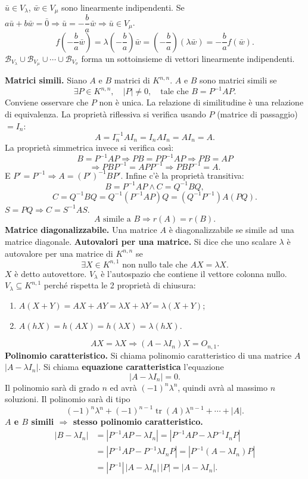 \documentclass[11pt,a4paper]{article}
\newcommand{\pagina}[1]{\clearpage}
\begin{document}
$\bar u\in V_\lambda$, $\bar w\in V_\mu$ sono linearmente indipendenti.
Se $a\bar u+b\bar w=\bar0\Longrightarrow\bar u=-\dfrac ba\bar w\Longrightarrow\bar u\in V_\mu$.
\[f\left(-\frac ba\bar w\right)=\lambda\left(-\frac ba\right)\bar w=\left(-\frac ba\right)(\lambda\bar w)=-\frac ba f(\bar w).\]
$\mathcal B_{V_\lambda}\cup\mathcal B_{V_\mu}\cup\cdots\cup\mathcal B_{V_\sigma}$ forma un sottoinsieme di vettori linearmente indipendenti.

\pagina{52}
\textbf{Matrici simili.} Siano $A$ e $B$ matrici di $K^{n,n}$. $A$ e $B$ sono matrici simili se
\[\exists P\in K^{n,n},\quad |P|\ne0,\quad\text{tale che }B=P^{-1}AP.\]
Conviene osservare che $P$ non è unica.
La relazione di similitudine è una relazione di equivalenza.
La proprietà riflessiva si verifica usando $P$ (matrice di passaggio) $=I_n$:
\[A=I_n^{-1}AI_n=I_nAI_n=AI_n=A.\]
La proprietà simmetrica invece si verifica così:
\[B=P^{-1}AP\Longrightarrow PB=PP^{-1}AP\Longrightarrow PB=AP\]
\[\Longrightarrow PBP^{-1}=APP^{-1}\Longrightarrow PBP^{-1}=A.\]
E $P'=P^{-1}\Longrightarrow A=(P')^{-1}BP'$.
Infine c'è la proprietà transitiva:
\[B=P^{-1}AP\land C=Q^{-1}BQ,\]
\[C=Q^{-1}BQ=Q^{-1}(P^{-1}AP)Q=(Q^{-1}P^{-1})A(PQ).\]
$S=PQ\Longrightarrow C=S^{-1}AS$.
\[A\text{ simile a }B\Longrightarrow r(A)=r(B).\]
\textbf{Matrice diagonalizzabile.} Una matrice $A$ è diagonalizzabile se simile ad una matrice diagonale.
\pagina{53}
\textbf{Autovalori per una matrice.} Si dice che uno scalare $\lambda$ è autovalore per una matrice di $K^{n,n}$ se
\[\exists X\in K^{n,1}\text{ non nullo tale che }AX=\lambda X.\]
$X$ è detto autovettore. $V_\lambda$ è l'autospazio che contiene il vettore colonna nullo. $V_\lambda\subseteq K^{n,1}$ perché rispetta le 2 proprietà di chiusura:
\begin{enumerate}\item $A(X+Y)=AX+AY=\lambda X+\lambda Y=\lambda(X+Y)$;
\item $A(hX)=h(AX)=h(\lambda X)=\lambda(hX)$.\end{enumerate}
\[AX=\lambda X\Longrightarrow(A-\lambda I_n)X=O_{n,1}.\]
\textbf{Polinomio caratteristico.} Si chiama polinomio caratteristico di una matrice $A$ $|A-\lambda I_n|$. Si chiama \textbf{equazione caratteristica} l'equazione
\[|A-\lambda I_n|=0.\]
Il polinomio sarà di grado $n$ ed avrà $(-1)^n\lambda^n$, quindi avrà al massimo $n$ soluzioni. Il polinomio sarà di tipo
\[(-1)^n\lambda^n+(-1)^{n-1}\operatorname{tr}(A)\lambda^{n-1}+\cdots+|A|.\]
\textbf{$A$ e $B$ simili $\Longrightarrow$ stesso polinomio caratteristico.}
\[\begin{aligned}
|B-\lambda I_n|&=|P^{-1}AP-\lambda I_n|=|P^{-1}AP-\lambda P^{-1}I_nP|\\
&=|P^{-1}AP-P^{-1}\lambda I_nP|=|P^{-1}(A-\lambda I_n)P|\\
&=|P^{-1}|\,|A-\lambda I_n|\,|P|=|A-\lambda I_n|.
\end{aligned}\]
\end{document}
